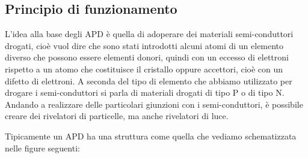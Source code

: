 \subsection{Principio di funzionamento}
L'idea alla base degli APD è quella di adoperare dei materiali semi-conduttori drogati, cioè vuol dire che sono stati introdotti alcuni atomi di un elemento diverso che possono essere elementi donori, quindi con un eccesso di elettroni rispetto a un atomo che costituisce il cristallo oppure accettori, cioè con un difetto di elettroni. A seconda del tipo di elemento che abbiamo utilizzato per drogare i semi-conduttori si parla di materiali drogati di tipo P o di tipo N. Andando a realizzare delle particolari giunzioni con i semi-conduttori, è possibile creare dei rivelatori di particelle, ma anche rivelatori di luce. 

Tipicamente un APD ha una struttura come quella che vediamo schematizzata nelle figure seguenti:

